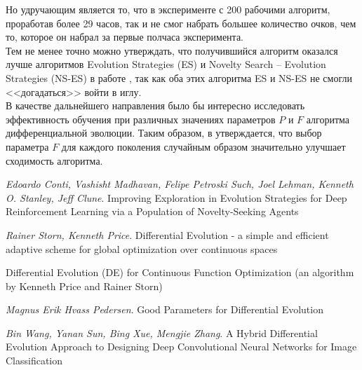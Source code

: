 \documentclass[12pt]{article}
\begin{document}
    Но удручающим является то, что в эксперименте с 200 рабочими алгоритм, проработав более 29 часов, так и не смог набрать большее количество очков, чем то, которое он набрал за первые полчаса эксперимента. \\

    Тем не менее точно можно утверждать, что получившийся алгоритм оказался лучше алгоритмов Evolution Strategies (ES) и Novelty Search -- Evolution Strategies (NS-ES) в работе \cite{uber}, так как оба этих алгоритма ES и NS-ES не смогли <<догадаться>> войти в иглу. \\

    В качестве дальнейшего направления было бы интересно исследовать эффективность обучения при различных значениях параметров $P$ и $F$ алгоритма дифференциальной эволюции. Таким образом, в \cite{DE} утверждается, что выбор параметра $F$ для каждого поколения случайным образом значительно улучшает сходимость алгоритма.

\newpage
{}
\begin{thebibliography}{}
    \emph{Edoardo Conti, Vashisht Madhavan, Felipe Petroski Such, Joel Lehman, Kenneth O. Stanley, Jeff Clune}.
    Improving Exploration in Evolution Strategies for Deep Reinforcement Learning via a Population of Novelty-Seeking Agents
    
    \emph{Rainer Storn, Kenneth Price}. Differential Evolution - a simple and efficient adaptive scheme for global optimization over continuous spaces

    Differential Evolution (DE) for Continuous Function Optimization (an algorithm by Kenneth Price and Rainer Storn)

    \emph{Magnus Erik Hvass Pedersen}. Good Parameters for Differential Evolution

    \emph{Bin Wang, Yanan Sun, Bing Xue, Mengjie Zhang}. A Hybrid Differential Evolution Approach to Designing Deep Convolutional Neural Networks for Image Classification \\

\end{thebibliography}
\end{document}
